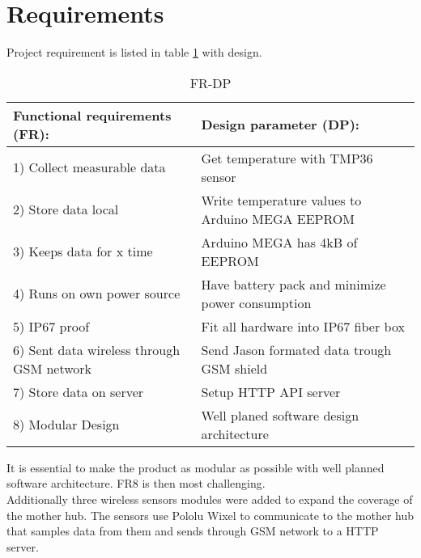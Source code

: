 \section{Requirements}\label{requirements}
Project requirement is listed in table \ref{tbl:FRDP} with design. 

\begin{table}[h!]
	\caption{FR-DP}
	\label{tbl:FRDP}
\begin{tabular}{|p{8cm}|p{8cm}|}
		\hline \textbf{Functional requirements (FR):} & \textbf{Design parameter (DP):} \\ 
		\hline 1) Collect measurable data &   Get temperature with TMP36 sensor\\
		\hline 2) Store data local &   Write temperature values to Arduino MEGA EEPROM \\
		\hline 3) Keeps data for x time &  Arduino MEGA \cite{arduinoMega} has 4kB of EEPROM \\
		\hline 4) Runs on own power source & Have battery pack and minimize power consumption \\ 
		\hline 5) IP67 proof &   Fit all hardware into IP67 fiber box\\
		\hline 6) Sent data wireless through GSM network & Send Jason formated data trough GSM shield \\ 
		\hline 7) Store data on server & Setup HTTP API server \\ 
		\hline 8) Modular Design & Well planed software design architecture \\ 
		\hline
	\end{tabular}
\end{table}

It is essential to make the product as modular as possible with well planned software architecture. FR8 is then most challenging. \\
Additionally three wireless sensors modules were added to expand the coverage of the mother hub.  The sensors use Pololu Wixel to communicate to the mother hub that samples data from them and sends through GSM network to a HTTP server.